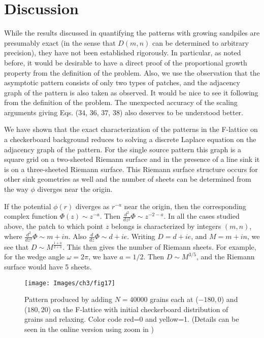 \documentclass[11pt,a4paper]{book}
\begin{document}
\section{Discussion}\label{ch3.8}
While the results discussed in quantifying the patterns with growing sandpiles are presumably exact (in the
sense that $D\left( m, n \right)$ can be determined to arbitrary precision),
they have not been established rigorously. In particular, as noted before, it would be desirable to
have a direct proof of the proportional growth property from the definition of the problem. Also, we
use the observation that the asymptotic pattern consists of only two types of patches, and the
adjacency graph of the pattern is also taken as observed. It would be nice to see it following from
the definition of the problem. The unexpected accuracy of the scaling arguments giving Eqs. ($34$, $36$, $37$, $38$)
also deserves to be understood better.


We have shown that the exact characterization of the patterns
in the F-lattice on a checkerboard background reduces to solving  a discrete
Laplace equation on the adjacency  graph of the pattern. For the single source pattern
this graph is a square grid on a two-sheeted Riemann surface and in
the presence of a line sink it is on a three-sheeted Riemann surface.
This Riemann surface structure occurs for other sink geometries as well
and the number of sheets can be determined from the way
$\phi$ diverges near the origin. 

If the potential $\phi(r)$ diverges as $ r^{-a}$ near the origin, then the corresponding
complex function $\Phi(z) \sim z^{-a}$.  Then $\frac {d^2}{dz^2} \Phi \sim z^{-2-a}$. In
all the cases studied above, the patch to which point $z$ belongs is characterized by
integers $(m,n)$, where $\frac {d^2}{dz^2} \Phi  \sim m+in$. Also $\frac{d}{dz} \Phi \sim
d+ie $. Writing $D=d+i e$, and $M = m+in$, we see that $D \sim M ^{\frac{1+a}{2+a} }$.
This then gives the number of Riemann sheets. For example, for the wedge angle
$\omega=2\pi$, we have $a=1/2$. Then $D \sim M^{3/5}$, and the Riemann surface would have 5 sheets. 
\begin{figure}
\begin{center}
\texttt{[image: Images/ch3/fig17]}
\caption{ Pattern produced by adding $N=40000$ grains each at ($-180,0$) and 
($180,20$) on the F-lattice with initial checkerboard distribution of grains and 
relaxing. Color code red=0 and yellow=1. (Details can be seen in the online
version using zoom in )}
\label{fig:distr}
\end{center}
\end{figure}
\end{document}
